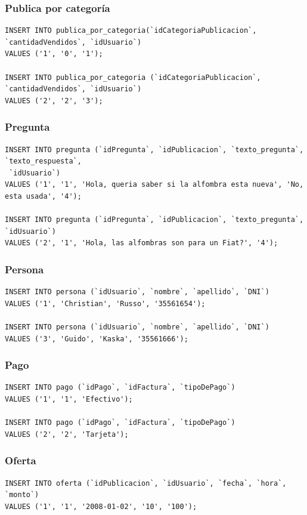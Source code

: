 \documentclass[a4paper, 10pt, twoside]{article}
\begin{document}
\subsubsection{Publica por categor\'ia}
\begin{verbatim}
INSERT INTO publica_por_categoria(`idCategoriaPublicacion`, `cantidadVendidos`, `idUsuario`) 
VALUES ('1', '0', '1');

INSERT INTO publica_por_categoria (`idCategoriaPublicacion`, `cantidadVendidos`, `idUsuario`) 
VALUES ('2', '2', '3');
\end{verbatim}
\subsubsection{Pregunta}
\begin{verbatim}
INSERT INTO pregunta (`idPregunta`, `idPublicacion`, `texto_pregunta`, `texto_respuesta`,
 `idUsuario`) 
VALUES ('1', '1', 'Hola, queria saber si la alfombra esta nueva', 'No, esta usada', '4');

INSERT INTO pregunta (`idPregunta`, `idPublicacion`, `texto_pregunta`, `idUsuario`) 
VALUES ('2', '1', 'Hola, las alfombras son para un Fiat?', '4');
\end{verbatim}
\subsubsection{Persona}
\begin{verbatim}
INSERT INTO persona (`idUsuario`, `nombre`, `apellido`, `DNI`) 
VALUES ('1', 'Christian', 'Russo', '35561654');

INSERT INTO persona (`idUsuario`, `nombre`, `apellido`, `DNI`) 
VALUES ('3', 'Guido', 'Kaska', '35561666');
\end{verbatim}
\subsubsection{Pago}
\begin{verbatim}
INSERT INTO pago (`idPago`, `idFactura`, `tipoDePago`) 
VALUES ('1', '1', 'Efectivo');

INSERT INTO pago (`idPago`, `idFactura`, `tipoDePago`) 
VALUES ('2', '2', 'Tarjeta');
\end{verbatim}
\subsubsection{Oferta}
\begin{verbatim}
INSERT INTO oferta (`idPublicacion`, `idUsuario`, `fecha`, `hora`, `monto`) 
VALUES ('1', '1', '2008-01-02', '10', '100');
\end{verbatim}
\end{document}
